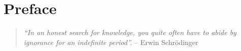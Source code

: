 \chapter{Preface}


\vspace{7cm}


\begin{quote}
\emph{``In an honest search for knowledge, you quite often have to abide by ignorance for an indefinite period''.} -- Erwin Schrödinger
\end{quote}

